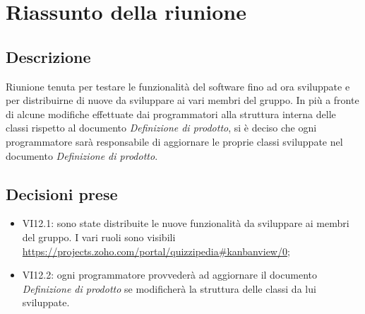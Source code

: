 \section{Riassunto della riunione}
\subsection{Descrizione}

Riunione tenuta per testare le funzionalità del software fino ad ora sviluppate e per distribuirne di nuove da sviluppare ai vari membri del gruppo. In più a fronte di alcune modifiche effettuate dai programmatori alla struttura interna delle classi rispetto al documento \textit{Definizione di prodotto}, si è deciso che ogni programmatore sarà responsabile di aggiornare le proprie classi sviluppate nel documento \textit{Definizione di prodotto}.  

\subsection{Decisioni prese}
\begin{itemize}
\item VI12.1: sono state distribuite le nuove funzionalità da sviluppare ai membri del gruppo. I vari ruoli sono visibili  \url{https://projects.zoho.com/portal/quizzipedia#kanbanview/0};
\item VI12.2: ogni programmatore provvederà ad aggiornare il documento \textit{Definizione di prodotto} se modificherà la struttura delle classi da lui sviluppate.
\end{itemize}
